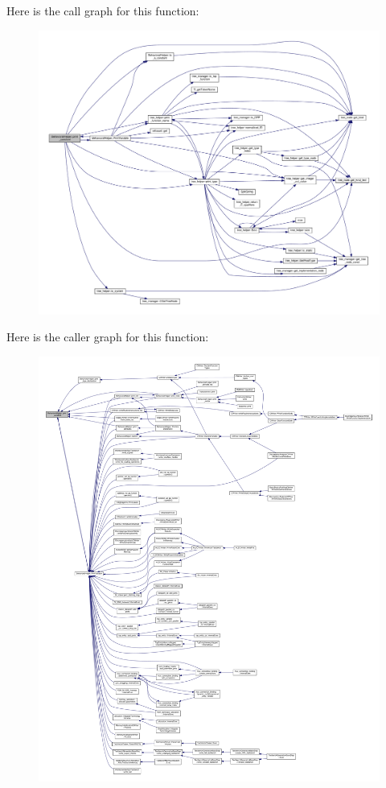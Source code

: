 Here is the call graph for this function\+:
\nopagebreak
\begin{figure}[H]
\begin{center}
\leavevmode
\includegraphics[width=350pt]{dd/db2/classBehavioralHelper_a5dcc301cc61cb672f0a2b593ceb61a2f_cgraph}
\end{center}
\end{figure}
Here is the caller graph for this function\+:
\nopagebreak
\begin{figure}[H]
\begin{center}
\leavevmode
\includegraphics[width=350pt]{dd/db2/classBehavioralHelper_a5dcc301cc61cb672f0a2b593ceb61a2f_icgraph}
\end{center}
\end{figure}
